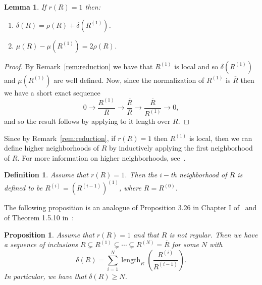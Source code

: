 \documentclass{article}
\newtheorem{definition}[theorem]{Definition}
\newtheorem{lemma}[theorem]{Lemma}
\newtheorem{proposition}[theorem]{Proposition}
\DeclareMathOperator{\length}{length}
\numberwithin{theorem}{section}
\begin{document}
\begin{lemma}\label{lem:rho_delta}
    If $r(R)=1$ then:
    \begin{enumerate}
        \item $\delta(R)=\rho(R)+\delta(R^{(1)})$.
        \item $\mu(R)-\mu(R^{(1)})  = 2\rho(R)$.
    \end{enumerate}
\end{lemma}

\begin{proof}
    By Remark~\ref{rem:reduction} we have that $R^{(1)}$ is local and so $\delta(R^{(1)})$ and $\mu(R^{(1)})$ are well defined. Now, since the normalization of $R^{(1)}$ is $\overline{R}$ then we have a short exact sequence
    \begin{equation*}
        0 \to \frac{R^{(1)}}{R} \to \frac{\overline{R}}{R} \to \frac{\overline{R}}{R^{(1)}} \to 0,
    \end{equation*}
    \noindent and so the result follows by applying to it length over $R$. 
\end{proof}

Since by Remark~\ref{rem:reduction}, if $r(R)=1$ then $R^{(1)}$ is local, then we can define higher neighborhoods of $R$ by inductively applying the first neighborhood of $R$. For more information on higher neighborhoods, see~\cite{northcott1955neighbourhoods, northcott1957notion}.  

\begin{definition}
    Assume that $r(R)=1$. Then the $i-$th neighborhood of $R$ is defined to be $R^{(i)}=\left(R^{(i-1)}\right)^{(1)}$, where $R = R^{(0)}$. 
\end{definition}

The following proposition is an analogue of Proposition 3.26 in Chapter I of~\cite{greuel2007introduction} and of Theorem 1.5.10 in~\cite{campillo2006algebroid}:

\begin{proposition}\label{rem:higher_NBHD}
    Assume that $r(R)=1$ and that $R$ is not regular. Then we have a sequence of inclusions $R \subsetneq R^{(1)} \subsetneq \cdots \subsetneq R^{(N)} = \overline{R}$ for some $N$ with
    \begin{equation*}
        \delta(R) = \sum_{i=1}^N \length_R \left(\frac{R^{(i)}}{R^{(i-1)}}\right).
    \end{equation*}
    In particular, we have that $\delta(R) \geq N$. 
\end{proposition}
\end{document}
